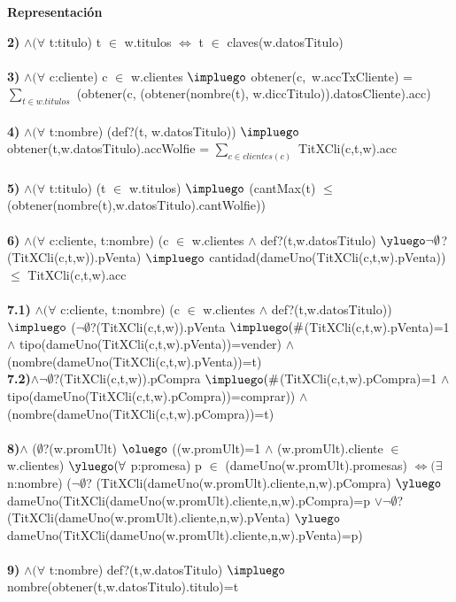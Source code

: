 \documentclass[10pt, a4paper]{article}
\newenvironment{Representacion}{%
  \vspace*{2ex}%
  \noindent\textbf{\Large Representaci\'{o}n}%
  \vspace*{2ex}%
}{}
\begin{document}
\begin{Representacion}
{  \textbf{2)} $\wedge (\forall$ t:titulo) t $\in$ w.titulos $\Leftrightarrow$ t $\in$ claves(w.datosTitulo)\\ \\
  \textbf{3)} $\wedge (\forall$ c:cliente) c $\in$ w.clientes $\impluego$ obtener(c,\ w.accTxCliente) = $\sum_{t \in w.titulos}^{}$ (obtener(c, (obtener(nombre(t), w.diccTitulo)).datosCliente).acc) \\ \\
  \textbf{4)} $\wedge (\forall$ t:nombre) (def?(t, w.datosTitulo)) $\impluego$ obtener(t,w.datosTitulo).accWolfie = $\sum_{c \in clientes(c)}^{}$ TitXCli(c,t,w).acc \\ \\
  \textbf{5)} $\wedge (\forall$ t:titulo) (t $\in$ w.titulos) $\impluego$ (cantMax(t) $\leq$ (obtener(nombre(t),w.datosTitulo).cantWolfie))\\ \\
  \textbf{6)} $\wedge (\forall$ c:cliente, t:nombre) (c $\in$ w.clientes $\wedge$ def?(t,w.datosTitulo) $\yluego \neg \emptyset$?(TitXCli(c,t,w)).pVenta) $\impluego$ cantidad(dameUno(TitXCli(c,t,w).pVenta)) $\leq$ TitXCli(c,t,w).acc \\ \\
  \textbf{7.1)} $\wedge (\forall$ c:cliente, t:nombre) (c $\in$ w.clientes $\wedge$ def?(t,w.datosTitulo)) $\impluego$ ($\neg \emptyset$?(TitXCli(c,t,w)).pVenta $\impluego (\#$(TitXCli(c,t,w).pVenta)=1 $\wedge$ tipo(dameUno(TitXCli(c,t,w).pVenta))=vender) $\wedge$ (nombre(dameUno(TitXCli(c,t,w).pVenta))=t) \\
  \textbf{7.2)}$\wedge \neg \emptyset$?(TitXCli(c,t,w)).pCompra $\impluego (\#$(TitXCli(c,t,w).pCompra)=1 $\wedge$ tipo(dameUno(TitXCli(c,t,w).pCompra))=comprar)) $\wedge$ (nombre(dameUno(TitXCli(c,t,w).pCompra))=t)  \\ \\
  \textbf{8)}$\wedge$ ($\emptyset$?(w.promUlt) $\oluego$ ((w.promUlt)=1 $\wedge$ (w.promUlt).cliente $\in$ w.clientes) $\yluego (\forall$ p:promesa) p $\in$ (dameUno(w.promUlt).promesas) $\Leftrightarrow (\exists$ n:nombre) ($\neg \emptyset$? (TitXCli(dameUno(w.promUlt).cliente,n,w).pCompra) $\yluego$ dameUno(TitXCli(dameUno(w.promUlt).cliente,n,w).pCompra)=p $\vee \neg \emptyset$? (TitXCli(dameUno(w.promUlt).cliente,n,w).pVenta) $\yluego$ dameUno(TitXCli(dameUno(w.promUlt).cliente,n,w).pVenta)=p) \\ \\
  \textbf{9)} $\wedge (\forall$ t:nombre) def?(t,w.datosTitulo) $\impluego$ nombre(obtener(t,w.datosTitulo).titulo)=t \\ 
  
}
\end{Representacion}
\end{document}

